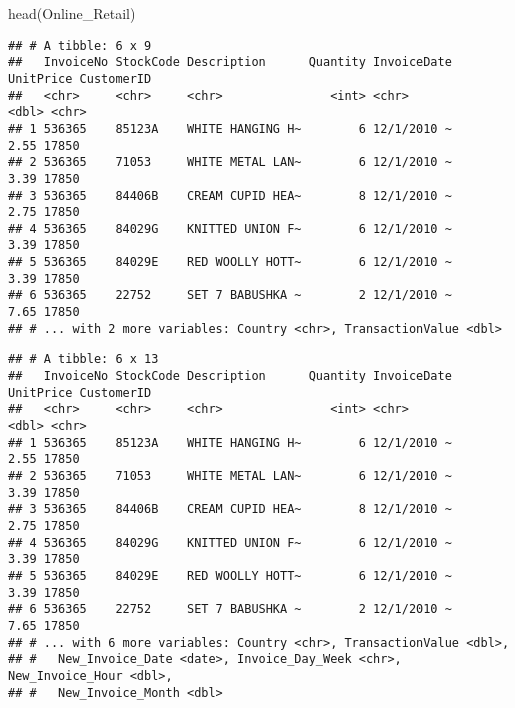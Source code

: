 \documentclass[
]{article}
\newenvironment{Shaded}{\begin{snugshade}}{\end{snugshade}}
\newcommand{\FunctionTok}[1]{\textcolor[rgb]{0.00,0.00,0.00}{#1}}
\newcommand{\NormalTok}[1]{#1}
\newcommand{\OtherTok}[1]{\textcolor[rgb]{0.56,0.35,0.01}{#1}}
\newcommand{\SpecialCharTok}[1]{\textcolor[rgb]{0.00,0.00,0.00}{#1}}
\newcommand{\StringTok}[1]{\textcolor[rgb]{0.31,0.60,0.02}{#1}}
\begin{document}
\begin{Shaded}
\begin{Highlighting}[]
\FunctionTok{head}\NormalTok{(Online\_Retail)}
\end{Highlighting}
\end{Shaded}

\begin{verbatim}
## # A tibble: 6 x 9
##   InvoiceNo StockCode Description      Quantity InvoiceDate UnitPrice CustomerID
##   <chr>     <chr>     <chr>               <int> <chr>           <dbl> <chr>     
## 1 536365    85123A    WHITE HANGING H~        6 12/1/2010 ~      2.55 17850     
## 2 536365    71053     WHITE METAL LAN~        6 12/1/2010 ~      3.39 17850     
## 3 536365    84406B    CREAM CUPID HEA~        8 12/1/2010 ~      2.75 17850     
## 4 536365    84029G    KNITTED UNION F~        6 12/1/2010 ~      3.39 17850     
## 5 536365    84029E    RED WOOLLY HOTT~        6 12/1/2010 ~      3.39 17850     
## 6 536365    22752     SET 7 BABUSHKA ~        2 12/1/2010 ~      7.65 17850     
## # ... with 2 more variables: Country <chr>, TransactionValue <dbl>
\end{verbatim}

\begin{Shaded}
\end{Shaded}

\begin{verbatim}
## # A tibble: 6 x 13
##   InvoiceNo StockCode Description      Quantity InvoiceDate UnitPrice CustomerID
##   <chr>     <chr>     <chr>               <int> <chr>           <dbl> <chr>     
## 1 536365    85123A    WHITE HANGING H~        6 12/1/2010 ~      2.55 17850     
## 2 536365    71053     WHITE METAL LAN~        6 12/1/2010 ~      3.39 17850     
## 3 536365    84406B    CREAM CUPID HEA~        8 12/1/2010 ~      2.75 17850     
## 4 536365    84029G    KNITTED UNION F~        6 12/1/2010 ~      3.39 17850     
## 5 536365    84029E    RED WOOLLY HOTT~        6 12/1/2010 ~      3.39 17850     
## 6 536365    22752     SET 7 BABUSHKA ~        2 12/1/2010 ~      7.65 17850     
## # ... with 6 more variables: Country <chr>, TransactionValue <dbl>,
## #   New_Invoice_Date <date>, Invoice_Day_Week <chr>, New_Invoice_Hour <dbl>,
## #   New_Invoice_Month <dbl>
\end{verbatim}
\end{document}
